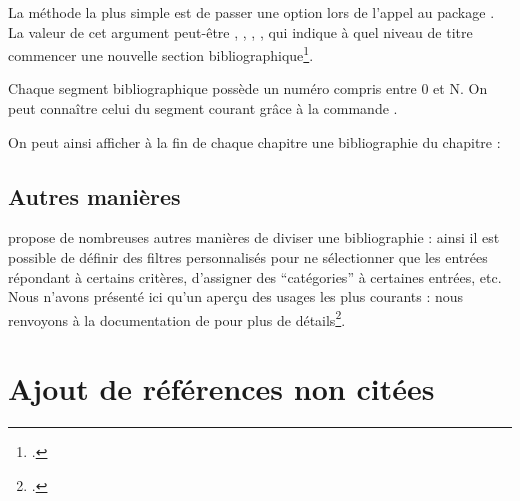La méthode la plus simple est de passer une option  lors de l'appel au package . La valeur de cet argument peut-être , , , , qui indique à quel niveau de titre commencer une nouvelle section bibliographique\footcite[Il est toutefois possible de créer des sections bibliographiques autrement que par niveaux de titre, voir :][]{biblatex_segment}.

Chaque segment bibliographique possède un numéro compris entre 0 et N. On peut connaître celui du segment courant grâce à la commande .

On peut ainsi afficher à la fin de chaque chapitre une bibliographie du chapitre :


\subsection{Autres manières}

 propose de nombreuses autres manières de diviser une bibliographie : ainsi il est possible de définir des filtres personnalisés pour ne sélectionner que les entrées répondant à certains critères, d'assigner des \enquote{catégories} à certaines entrées, etc. Nous n'avons présenté ici qu'un aperçu des usages les plus courants : nous renvoyons à la documentation de  pour plus de détails\footcite{biblatex_bibliographycommands}.

\section{Ajout de références non citées}

